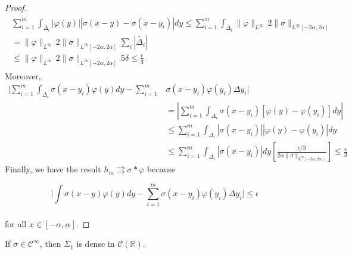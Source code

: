 \documentclass[../main.tex]{subfiles}
\begin{document}
\begin{proof}
		
		\begin{multline*}
			\begin{split}
				\sum_{i=1}^m  \int_{\tilde{\Delta_i}} \left| \varphi(y)\right| \left| \sigma(x-y)-\sigma(x-y_i)\right|dy  \leq  \sum_{i=1}^m  \int_{\tilde{\Delta_i}} \| \varphi\|_{L^{\infty}} \, 2 \| \sigma \|_{L^{\infty}[-2\alpha,2\alpha]} \\
				 = \| \varphi\|_{L^{\infty}} \, 2 \| \sigma \|_{L^{\infty}[-2\alpha,2\alpha]} \sum_i| \tilde{\Delta_i} | \\
				 \leq \| \varphi\|_{L^{\infty}} \, 2 \| \sigma \|_{L^{\infty}[-2\alpha,2\alpha]} \, 5 \delta \leq \frac{\epsilon}{3}
			\end{split}
		\end{multline*}
		Moreover, 
\begin{equation*} 
	\begin{split}
		\Bigg| \sum_{i=1}^m \int_{\Delta_i} \sigma(x-y_i)\varphi(y)dy -  \sum_{i=1}^m &\sigma(x-y_i) \varphi(y_i)\Delta y_i \Bigg| \\
		& =  \left|  \sum_{i=1}^m \int_{\Delta_i} \sigma(x-y_i) [\varphi(y)-\varphi(y_i)] dy \right| \\
		& \leq  \sum_{i=1}^m \int_{\Delta_i}  \left| \sigma(x-y_i)\right| \left| \varphi(y) - \varphi(y_i)\right|dy  \\
		& \leq  \sum_{i=1}^m \int_{\Delta_i}  \left| \sigma(x-y_i)\right| dy \left[ \frac{\epsilon/3}{2\alpha \| \sigma\|_{L^\infty[-2\alpha,2\alpha]}}\right]  \leq \frac{\epsilon}{3} 
	\end{split}
\end{equation*}
Finally, we have the result $h_m \rightrightarrows \sigma \ast \varphi $ because

$$\Bigg| \int \sigma(x-y)\varphi(y)dy -  \sum_{i=1}^m \sigma(x-y_i) \varphi(y_i) \Delta y_i \Bigg| \leq \epsilon $$
\\ for all $x\in [-\alpha,\alpha ].$
	\end{proof}
	\vspace{\baselineskip} 
	\begin{lema}  \label{lemma4}
		If $\sigma \in \mathcal{C}^{\infty}$, then $ \Sigma_1$ is dense in  $\mathcal{C}(\mathbb{R})$.
	\end{lema}
	
\end{document}
